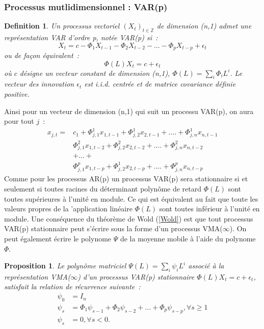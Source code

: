 \documentclass[11pt]{scrartcl} %
\newtheorem{Def}[theorem]{Definition}
\newtheorem{pro}[theorem]{Proposition}
\newcommand{\Xt}{\left(X_t\right)_{t\in\mathbb{Z}}}
\begin{document}
\subsubsection{Processus mutlidimensionnel : VAR(p)}
\begin{Def}
Un processus vectoriel $\Xt$ de dimension (n,1) admet une représentation VAR d'ordre p, notée VAR(p) si~:
$$
X_t = c - \Phi_1X_{t-1}-\Phi_2X_{t-2}-...- \Phi_pX_{t-p}+\epsilon_t
$$
ou de façon équivalent~:
$$
\Phi(L)X_t = c+\epsilon_t
$$
où $c$ désigne un vecteur constant de dimension (n,1), $\Phi(L)=\sum_i\Phi_iL^i$. Le vecteur des innovation $\epsilon_t$ est i.i.d. centrée et de matrice covariance définie positive.
\end{Def}
Ainsi pour un vecteur de dimension (n,1) qui suit un processu VAR(p), on aura pour tout $j$~:
\begin{align*}
x_{j,t}=&c_1+\Phi_{j,1}^1x_{1,t-1}+\Phi_{j,2}^1x_{2,t-1}+....+\Phi_{j,n}^1x_{n,t-1}\\
& \Phi_{j,1}^2x_{1,t-2}+\Phi_{j,2}^2x_{2,t-2}+....+\Phi_{j,n}^2x_{n,t-2}\\
&+...+\\
& \Phi_{j,1}^px_{1,t-p}+\Phi_{j,2}^1x_{2,t-p}+....+\Phi_{j,n}^px_{n,t-p}
\end{align*}
Comme pour les processus AR(p) un processus VAR(p) sera stationnaire si et seulement si toutes racines du déterminant polynôme de retard $\Phi(L)$ sont toutes supérieures à l'unité en module. Ce qui est équivalent au fait que toute les valeurs propres de la 'application linéaire $\Phi(L)$ sont toutes inférieur à l'unité en module. Une conséquence du théorème de Wold (\ref{Wold}) est que tout processus VAR(p) stationnaire peut s'écrire sous la forme d'un processus VMA($\infty$). On peut également écrire le polynome $\Psi$ de la moyenne mobile à l'aide du polynome $\Phi$.
\begin{pro}
Le polynôme matriciel $\Psi(L)=\sum_i \psi_iL^i$ associé à la représentation VMA($\infty$) d'un processus VAR(p) stationnaire $\Phi(L)X_t = c + \epsilon_t$, satisfait la relation de récurrence suivante~:
\begin{align*}
\psi_0&=I_n\\
\psi_s &= \Phi_1\psi_{s-1}+\Phi_2\psi_{s-2}+...+\Phi_p\psi_{s-p},\forall s\geq 1\\
\psi_s&=0, \forall s <0.
\end{align*}
\end{pro}
\end{document}
